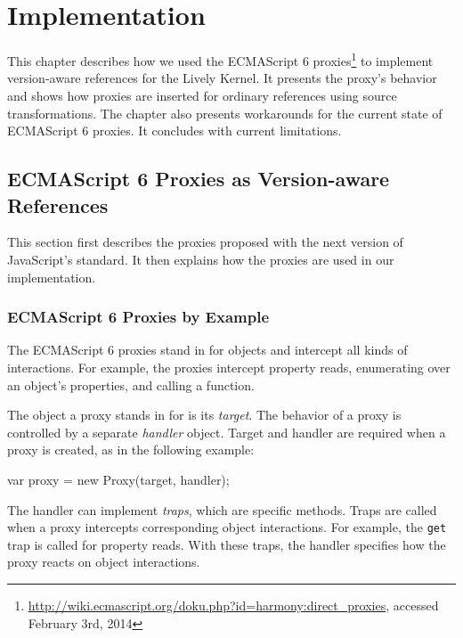 

\chapter{Implementation} \label{chapter:IMPLEMENTATION}

This chapter describes how we used the ECMAScript 6 proxies\footnote{\url{http://wiki.ecmascript.org/doku.php?id=harmony:direct_proxies}, accessed February 3rd, 2014} to implement version-aware references for the Lively Kernel.
It presents the proxy's behavior and shows how proxies are inserted for ordinary references using source transformations.
The chapter also presents workarounds for the current state of ECMAScript 6 proxies.
It concludes with current limitations.

\section{ECMAScript 6 Proxies as Version-aware References} \label{sec:IMPLEMENTATION:1}

This section first describes the proxies proposed with the next version of JavaScript's standard.
It then explains how the proxies are used in our implementation.

\subsection{ECMAScript 6 Proxies by Example} \label{subsec:IMPLEMENTATION:1.1}

The ECMAScript 6 proxies stand in for objects and intercept all kinds of interactions.
For example, the proxies intercept property reads, enumerating over an object's properties, and calling a function.

The object a proxy stands in for is its \emph{target}.
The behavior of a proxy is controlled by a separate \emph{handler} object.
Target and handler are required when a proxy is created, as in the following example:

\begin{code}{}{}
var proxy = new Proxy(target, handler);
\end{code}
\iffalse
\end{verbatim}\fi

The handler can implement \emph{traps}, which are specific methods.
Traps are called when a proxy intercepts corresponding object interactions.
For example, the \lstinline{get} trap is called for property reads.
With these traps, the handler specifies how the proxy reacts on object interactions.

